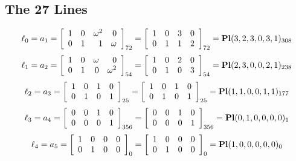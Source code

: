 \subsection*{The 27 Lines}
$$
\ell_{0} = a_{1} = 
\left[
\begin{array}{*{4}{r}}
1 & 0 & \omega^{2} & 0\\
0 & 1 & 1 & \omega \\
\end{array}
\right]
_{72}
=
\left[
\begin{array}{*{4}c}
1  & 0  & 3  & 0\\
0  & 1  & 1  & 2\\
\end{array}
\right]_{72}
={\rm\bf Pl}(3,2,3,0,3,1 )_{308}$$
$$
\ell_{1} = a_{2} = 
\left[
\begin{array}{*{4}{r}}
1 & 0 & \omega  & 0\\
0 & 1 & 0 & \omega^{2}\\
\end{array}
\right]
_{54}
=
\left[
\begin{array}{*{4}c}
1  & 0  & 2  & 0\\
0  & 1  & 0  & 3\\
\end{array}
\right]_{54}
={\rm\bf Pl}(2,3,0,0,2,1 )_{238}$$
$$
\ell_{2} = a_{3} = 
\left[
\begin{array}{*{4}{r}}
1 & 0 & 1 & 0\\
0 & 1 & 0 & 1\\
\end{array}
\right]
_{25}
=
\left[
\begin{array}{*{4}c}
1  & 0  & 1  & 0\\
0  & 1  & 0  & 1\\
\end{array}
\right]_{25}
={\rm\bf Pl}(1,1,0,0,1,1 )_{177}$$
$$
\ell_{3} = a_{4} = 
\left[
\begin{array}{*{4}{r}}
0 & 0 & 1 & 0\\
0 & 0 & 0 & 1\\
\end{array}
\right]
_{356}
=
\left[
\begin{array}{*{4}c}
0  & 0  & 1  & 0\\
0  & 0  & 0  & 1\\
\end{array}
\right]_{356}
={\rm\bf Pl}(0,1,0,0,0,0 )_{1}$$
$$
\ell_{4} = a_{5} = 
\left[
\begin{array}{*{4}{r}}
1 & 0 & 0 & 0\\
0 & 1 & 0 & 0\\
\end{array}
\right]
_{0}
=
\left[
\begin{array}{*{4}c}
1  & 0  & 0  & 0\\
0  & 1  & 0  & 0\\
\end{array}
\right]_{0}
={\rm\bf Pl}(1,0,0,0,0,0 )_{0}$$
